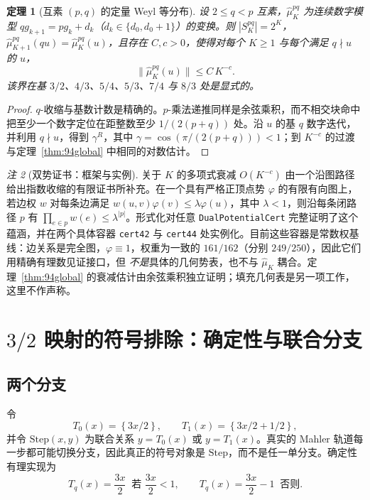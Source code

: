 \documentclass[11pt,a4paper]{article}
\newtheorem{theorem}{定理}[section]
\theoremstyle{remark}
\newtheorem{remark}[theorem]{注}
\newcommand{\fract}[1]{\left\{#1\right\}}
\begin{document}
\begin{theorem}[互素 \texorpdfstring{$(p,q)$}{(p,q)} 的定量 Weyl 等分布]
\label{thm:pqweyl}
设 $2 \le q < p$ 互素，$\hat\mu^{pq}_{K}$ 为连续数字模型 $q g_{k+1} = p g_{k} + d_{k}$（$d_{k} \in \{d_{0}, d_{0}+1\}$）的变换。则 $|S^{pq}_{K}| = 2^{K}$，$\hat\mu^{pq}_{K+1}(q u) = \hat\mu^{pq}_{K}(u)$，且存在 $C, c > 0$，使得对每个 $K \ge 1$ 与每个满足 $q \nmid u$ 的 $u$，
\[
  \|\hat\mu^{pq}_{K}(u)\| \le C\, K^{-c}.
\]
该界在基 $3/2$、$4/3$、$5/4$、$5/3$、$7/4$ 与 $8/3$ 处是显式的。
\end{theorem}

\begin{proof}
$q$-收缩与基数计数是精确的。$p$-乘法递推同样是余弦乘积，而不相交块命中把至少一个数字定位在距整数至少 $1/(2(p+q))$ 处。沿 $u$ 的基 $q$ 数字迭代，并利用 $q \nmid u$，得到 $\gamma^{R}$，其中 $\gamma = \cos(\pi/(2(p+q))) < 1$；到 $K^{-c}$ 的过渡与定理~\ref{thm:94global} 中相同的对数估计。
\end{proof}

\begin{remark}[双势证书：框架与实例]
\label{rem:dualpotential}
关于 $K$ 的多项式衰减 $O(K^{-c})$ 由一个沿图路径给出指数收缩的有限证书所补充。在一个具有严格正顶点势 $\varphi$ 的有限有向图上，若边权 $w$ 对每条边满足 $w(u,v)\varphi(v) \le \lambda \varphi(u)$，其中 $\lambda < 1$，则沿每条闭路径 $p$ 有 $\prod_{e \in p} w(e) \le \lambda^{|p|}$。形式化对任意 \texttt{DualPotentialCert} 完整证明了这个蕴涵，并在两个具体容器 \texttt{cert42} 与 \texttt{cert44} 处实例化。目前这些容器是常数权基线：边关系是完全图，$\varphi \equiv 1$，权重为一致的 $161/162$（分别 $249/250$），因此它们用精确有理数见证接口，但 \emph{不是}具体的几何势表，也不与 $\hat\mu_{K}$ 耦合。定理~\ref{thm:94global} 的衰减估计由余弦乘积独立证明；填充几何表是另一项工作，这里不作声称。
\end{remark}

\section{\texorpdfstring{$3/2$}{3/2} 映射的符号排除：确定性与联合分支}
\label{sec:threehalves}

\subsection{两个分支}

令
\[
  T_{0}(x) = \fract{3x/2}, \qquad T_{1}(x) = \fract{3x/2 + 1/2},
\]
并令 $\mathrm{Step}(x,y)$ 为联合关系 $y = T_{0}(x)$ 或 $y = T_{1}(x)$。真实的 Mahler 轨道每一步都可能切换分支，因此真正的符号对象是 $\mathrm{Step}$，而不是任一单分支。确定性有理实现为
\[
  T_{q}(x) = \frac{3x}{2} \ \text{ 若 } \frac{3x}{2} < 1, \qquad T_{q}(x) = \frac{3x}{2} - 1 \ \text{ 否则.}
\]
\end{document}
